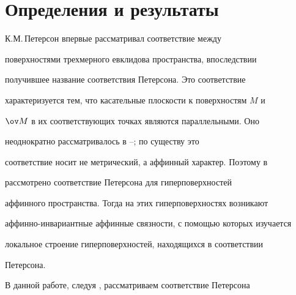 

 


\pagestyle{plain} %


 


 




 


\maketitle 


\label{begin} 


 


\section{Определения и результаты} 


 


К.М.\,Петерсон \cite{1} впервые рассматривал соответствие между 


поверхностями трехмерного евклидова пространства, впоследствии 


получившее название соответствия Петерсона. Это соответствие 


характеризуется тем, что касательные плоскости к поверхностям $M$ и 


$\ov M$ в их соответствующих точках являются параллельными. Оно 


неоднократно рассматривалось в \cite{2}--\cite{5}; по существу это 


соответствие носит не метрический, а аффинный характер. Поэтому в 


\cite{6} рассмотрено соответствие Петерсона для гиперповерхностей 


аффинного пространства. Тогда на этих гиперповерхностях возникают 


аффинно-инвариантные аффинные связности, с помощью которых изучается 


локальное строение гиперповерхностей, находящихся в соответствии 


Петерсона. 


 


В данной работе, следуя \cite{6}, рассматриваем соответствие Петерсона 


